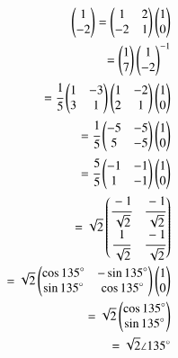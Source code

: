 \begin{enumerate}
\begin{align}
\\
    \begin{pmatrix}1 \\ -2\end{pmatrix} = \begin{pmatrix}1 & 2\\-2 & 1\end{pmatrix}\begin{pmatrix}1 \\ 0\end{pmatrix}
\\
    =\begin{pmatrix}1 \\ 7\end{pmatrix}\begin{pmatrix}1\\-2\end{pmatrix}^{-1}
\\
    =\cfrac{1}{5}\begin{pmatrix}1 & -3\\3 & 1\end{pmatrix}\begin{pmatrix}1 & -2\\2 & 1\end{pmatrix}\begin{pmatrix}1 \\ 0\end{pmatrix}
\\
    =\cfrac{1}{5}\begin{pmatrix}-5 & -5\\5 & -5\end{pmatrix}\begin{pmatrix}1 \\ 0\end{pmatrix}
\\
    =\cfrac{5}{5}\begin{pmatrix}-1 & -1\\1 & -1\end{pmatrix}\begin{pmatrix}1 \\ 0\end{pmatrix}
\\
    =\sqrt{2}\begin{pmatrix}\cfrac{-1}{\sqrt{2}} & \cfrac{-1}{\sqrt{2}} \\ \cfrac{1}{\sqrt{2}} & \cfrac{-1}{\sqrt{2}}\end{pmatrix}
\\
    =\sqrt{2}\begin{pmatrix}\cos{135}\degree & -\sin{135}\degree\\ \sin{135}\degree & \cos{135}\degree\end{pmatrix}\begin{pmatrix}1 \\ 0\end{pmatrix}
\\
    =\sqrt{2}\begin{pmatrix}\cos{135}\degree \\ \sin{135}\degree\end{pmatrix}
\\
    =\sqrt{2} \angle 135 \degree
\end{align}
\end{enumerate}


